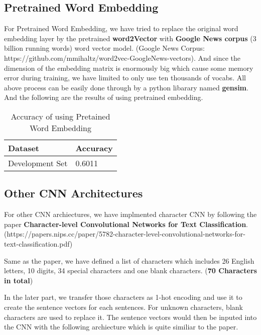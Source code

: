 \documentclass{article}
\begin{document}
\subsection{Pretrained Word Embedding}
For Pretrained Word Embedding, we have tried to replace the original word embedding layer by the pretrained \textbf{word2Vector} with \textbf{Google News corpus} (3 billion running words) word vector model. (Google News Corpus: https://github.com/mmihaltz/word2vec-GoogleNews-vectors). And since the dimension of the embedding matrix is enormously big which cause some memory error during training, we have limited to only use ten thousands of vocabs. All above process can be easily done through by a python libarary named \textbf{gensim}. And the following are the results of using pretrained embedding.

\begin{table}[htb]
	\caption{Accuracy of using Pretained Word Embedding}
	\label{sample-table}
	\centering
	\begin{tabular}{ll}
		\toprule
		\cmidrule{1-2}
		Dataset &Accuracy\\
		\midrule
		Development Set & 0.6011  \\
		\bottomrule
	\end{tabular}
\end{table}

\pagebreak

\subsection{Other CNN Architectures}
For other CNN archiectures, we have implmented character CNN by following the paper \textbf{Character-level Convolutional Networks for Text Classification}. (https://papers.nips.cc/paper/5782-character-level-convolutional-networks-for-text-classification.pdf) 

Same as the paper, we have defined a list of characters which includes 26 English letters, 10 digits, 34 special characters and one blank characters. (\textbf{70 Characters in total})

In the later part, we transfer those characters as 1-hot encoding and use it to create the sentence vectors for each sentences. For unknown characters, blank characters are used to replace it. The sentence vectors would then be inputed into the CNN with the following archiecture which is quite similiar to the paper.
\end{document}
